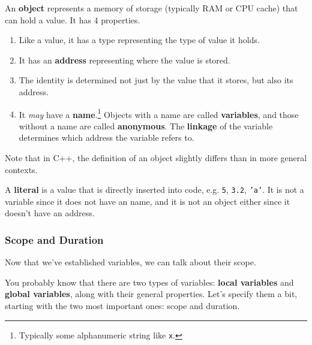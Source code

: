 \documentclass{article}
\begin{document}
    \begin{definition}
      An \textbf{object} represents a memory of storage (typically RAM or CPU cache) that can hold a value. It has 4 properties. 
      \begin{enumerate}
        \item Like a value, it has a type representing the type of value it holds. 
        \item It has an \textbf{address} representing where the value is stored.  
        \item The identity is determined not just by the value that it stores, but also its address. 
        \item It \textit{may} have a \textbf{name}.\footnote{Typically some alphanumeric string like \texttt{x}.} Objects with a name are called \textbf{variables}, and those without a name are called \textbf{anonymous}. The \textbf{linkage} of the variable determines which address the variable refers to. 
      \end{enumerate}
      Note that in C++, the definition of an object slightly differs than in more general contexts. 
    \end{definition} 

    \begin{definition}[Literal]
      A \textbf{literal} is a value that is directly inserted into code, e.g. \texttt{5}, \texttt{3.2}, \texttt{'a'}. It is not a variable since it does not have an name, and it is not an object either since it doesn't have an address. 
    \end{definition} 

    \subsubsection{Scope and Duration} 

      Now that we've established variables, we can talk about their scope. 
      
      \begin{definition}[Block]
        
      \end{definition}

      You probably know that there are two types of variables: \textbf{local variables} and \textbf{global variables}, along with their general properties. Let's specify them a bit, starting with the two most important ones: scope and duration.  
\end{document}
